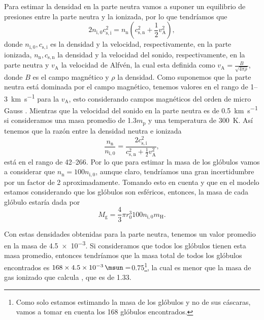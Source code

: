 \documentclass{book}
\begin{document}
Para estimar la densidad en la parte neutra vamos a suponer un equilibrio de presiones entre la parte neutra y la ionizada, por lo que tendríamos que
\begin{equation}
    2 n_\mathrm{i,0}c_\mathrm{s,i}^2 = n_\mathrm{n}(c_\mathrm{s,n}^2+\frac{1}{2}v_\mathrm{A}^2),
\end{equation}
donde $n_\mathrm{i,0}, c_\mathrm{s,i}$ es la densidad y la velocidad, respectivamente, en la parte ionizada, $n_\mathrm{n}, c_\mathrm{s,n}$ la densidad y la velocidad del sonido, respectivamente, en la parte neutra y $v_\mathrm{A}$ la velocidad de Alfvén, la cual esta definida como $v_\mathrm{A}=\frac{B}{\sqrt{4\pi \rho}}$,  donde $B$ es el campo magnético y $\rho$ la densidad. Como suponemos que la parte neutra está dominada por el campo magnético, tenemos valores en el rango de 1--\SI{3}{km.s^{-1}} para la $v_\mathrm{A}$, esto considerando campos magnéticos del orden de micro Gauss \citep{Bertoldi_1989}. Mientras que la velocidad del sonido en la parte neutra es de \SI{0.5}{km.s^{-1}} si consideramos una masa promedio de 1.3$m_\mathrm{p}$ y una temperatura de \SI{300}{K}. Así tenemos que la razón entre la densidad neutra e ionizada 
\begin{equation}
    \frac{n_\mathrm{n}}{n_\mathrm{i,0}}=\frac{2c_\mathrm{s,i}^2}{c_\mathrm{s,n}^2+\frac{1}{2}v_\mathrm{A}^2},
\end{equation}
está en el rango de 42--266. Por lo que para estimar la masa de los glóbulos vamos a considerar que $n_\mathrm{n}=100n_\mathrm{i,0}$, aunque claro, tendríamos una gran incertidumbre por un factor de 2 aproximadamente. Tomando esto en cuenta y que en el modelo estamos considerando que los glóbulos son esféricos, entonces, la masa de cada glóbulo estaría dada por
\begin{equation}
    M_\mathrm{g} = \frac{4}{3}\pi r_0^3 100n_\mathrm{i,0} m_\mathrm{H}.
\end{equation}

Con estas densidades obtenidas para la parte neutra, tenemos un valor promedio en la masa de \SI{4.5e-3}{\msun}.
Si consideramos que todos los glóbulos tienen esta masa promedio, entonces tendríamos que la masa total de todos los glóbulos encontrados es $168\times\SI{4.5e-3}{\msun}=$\SI{0.75}{\msun}\footnote{Como solo estamos estimando la masa de los glóbulos y no de sus cáscaras, vamos a tomar en cuenta los 168 glóbulos encontrados. }, la cual es menor que la masa de gas ionizado que calcula \cite{Grosdidier:1998}, que es de \SI{1.33}{\msun}.
\end{document}
